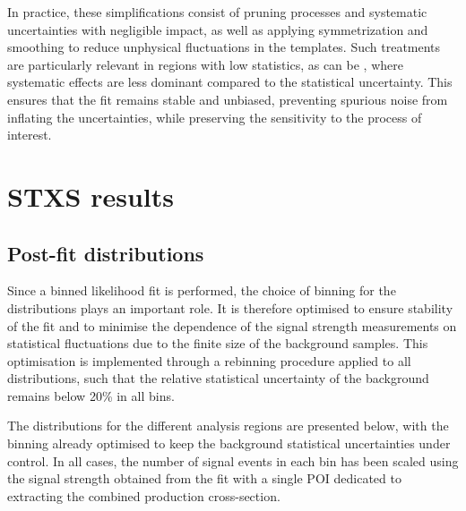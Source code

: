 In practice, these simplifications consist of pruning processes and systematic uncertainties with negligible impact, 
as well as applying symmetrization and smoothing to reduce unphysical fluctuations in the templates. 
Such treatments are particularly relevant in regions with low statistics, as can be \ttH, 
where systematic effects are less dominant compared to the statistical uncertainty. 
This ensures that the fit remains stable and unbiased, preventing spurious noise from inflating the uncertainties, 
while preserving the sensitivity to the process of interest.
\clearpage
\section{STXS results}
\label{sec:results_ttH}


\subsection{Post-fit distributions}
\label{post_fit}

Since a binned likelihood fit is performed, the choice of binning for the \mtt distributions plays an important role. It is therefore optimised to ensure stability of the fit and to minimise the dependence of the signal strength measurements on statistical fluctuations due to the finite size of the background samples. This optimisation is implemented through a rebinning procedure applied to all distributions, such that the relative statistical uncertainty of the background remains below 20\% in all bins.

The \mtt distributions for the different analysis regions are presented below, with the binning already optimised to keep the background statistical uncertainties under control. In all cases, the number of signal events in each bin has been scaled using the signal strength obtained from the fit with a single POI dedicated to extracting the combined production cross-section.

